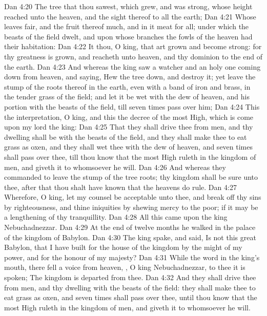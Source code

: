 \vs Dan 4:20 The tree that thou sawest, which grew, and was strong, whose height reached unto the heaven, and the sight thereof to all the earth;
\vs Dan 4:21 Whose leaves  fair, and the fruit thereof much, and in it  meat for all; under which the beasts of the field dwelt, and upon whose branches the fowls of the heaven had their habitation:
\vs Dan 4:22 It  thou, O king, that art grown and become strong: for thy greatness is grown, and reacheth unto heaven, and thy dominion to the end of the earth.
\vs Dan 4:23 And whereas the king saw a watcher and an holy one coming down from heaven, and saying, Hew the tree down, and destroy it; yet leave the stump of the roots thereof in the earth, even with a band of iron and brass, in the tender grass of the field; and let it be wet with the dew of heaven, and  his portion  with the beasts of the field, till seven times pass over him;
\vs Dan 4:24 This  the interpretation, O king, and this  the decree of the most High, which is come upon my lord the king:
\vs Dan 4:25 That they shall drive thee from men, and thy dwelling shall be with the beasts of the field, and they shall make thee to eat grass as oxen, and they shall wet thee with the dew of heaven, and seven times shall pass over thee, till thou know that the most High ruleth in the kingdom of men, and giveth it to whomsoever he will.
\vs Dan 4:26 And whereas they commanded to leave the stump of the tree roots; thy kingdom shall be sure unto thee, after that thou shalt have known that the heavens do rule.
\vs Dan 4:27 Wherefore, O king, let my counsel be acceptable unto thee, and break off thy sins by righteousness, and thine iniquities by shewing mercy to the poor; if it may be a lengthening of thy tranquillity.
\vs Dan 4:28 All this came upon the king Nebuchadnezzar.
\vs Dan 4:29 At the end of twelve months he walked in the palace of the kingdom of Babylon.
\vs Dan 4:30 The king spake, and said, Is not this great Babylon, that I have built for the house of the kingdom by the might of my power, and for the honour of my majesty?
\vs Dan 4:31 While the word  in the king's mouth, there fell a voice from heaven, , O king Nebuchadnezzar, to thee it is spoken; The kingdom is departed from thee.
\vs Dan 4:32 And they shall drive thee from men, and thy dwelling  with the beasts of the field: they shall make thee to eat grass as oxen, and seven times shall pass over thee, until thou know that the most High ruleth in the kingdom of men, and giveth it to whomsoever he will.
